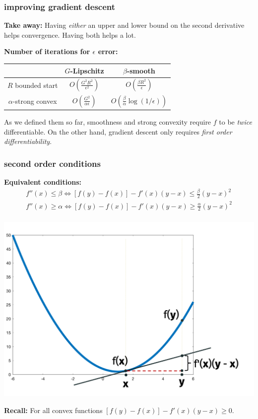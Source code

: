 \documentclass[compress]{beamer}
\begin{document}
\begin{frame}
	\frametitle{improving gradient descent}
	\textbf{Take away:} Having \emph{either} an upper and lower bound on the second derivative helps convergence. Having both helps a lot.

	\textbf{Number of iterations for $\epsilon$ error:}
	\begin{center}
		\begin{tabular}{c|cc}
			& $G$-Lipschitz & $\beta$-smooth   \\ \hline
			$R$ bounded start & $O\left(\frac{G^2R^2}{\epsilon^2}\right)$ & $O\left(\frac{\beta R^2}{\epsilon}\right)$ \\
			$\alpha$-strong convex & $O\left(\frac{G^2}{\alpha\epsilon}\right)$ & $O\left(\frac{\beta}{\alpha}\log(1/\epsilon)\right)$
		\end{tabular}
	\end{center}
	As we defined them so far, smoothness and strong convexity require $f$ to be \emph{twice} differentiable. On the other hand, gradient descent only requires \emph{first order differentiability}.
\end{frame}


\begin{frame}[t]
	\frametitle{second order conditions}
	\textbf{Equivalent conditions:}
	\begin{align*}
		f''(x) \leq \beta \iff [f(y) - f(x)] - f'(x)(y-x) \leq \frac{\beta}{2}(y-x)^2 \\
		f''(x) \geq \alpha \iff [f(y) - f(x)] - f'(x)(y-x) \geq \frac{\alpha}{2}(y-x)^2 \\
	\end{align*}
	\vspace{-4.5em}

	\begin{center}
		\includegraphics[width=.6\textwidth]{first_second_cond.png}

		\textbf{Recall:} For all convex functions $[f(y) - f(x)] - f'(x)(y-x) \geq 0$. 
	\end{center}
 \end{frame}
\end{document}
